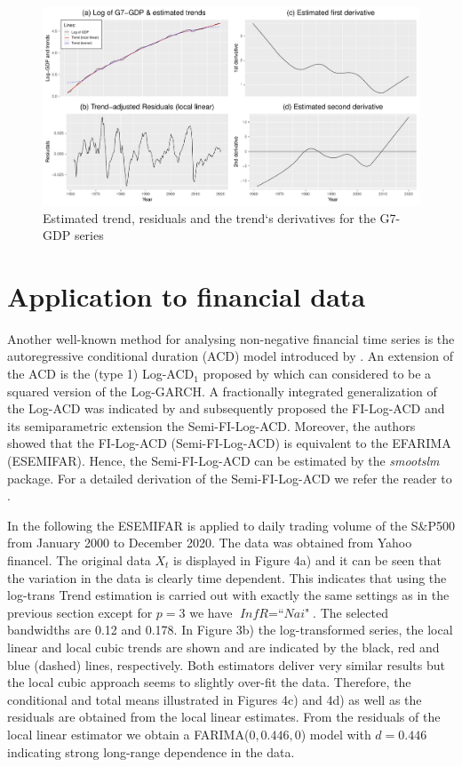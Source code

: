 \documentclass[12pt]{article}
\begin{document}
\begin{figure}[h!]
	\includegraphics[trim = {0cm 0mm 0mm 0mm}, width = \textwidth]{Abb/G7gdp.pdf}
	\caption{Estimated trend, residuals and the trend`s derivatives for the G7-GDP series}
\end{figure}


\section{Application to financial data}
 Another well-known method for analysing non-negative financial time series is the autoregressive conditional duration (ACD) model introduced by \citet{engle1998autoregressive}. An extension of the ACD is the (type 1) Log-ACD$_1$ proposed by \citet{bauwens2008moments} which can considered to be a squared version of the Log-GARCH. A fractionally integrated generalization of the Log-ACD was indicated by \citet{beran2015modelling} and subsequently \citet{feng2015forecasting} proposed the FI-Log-ACD and its semiparametric extension the Semi-FI-Log-ACD. Moreover, the authors showed that the FI-Log-ACD (Semi-FI-Log-ACD) is equivalent to the EFARIMA (ESEMIFAR). Hence, the Semi-FI-Log-ACD can be estimated by the \textit{smootslm} package. For a detailed derivation of the Semi-FI-Log-ACD we refer the reader to \citet{feng2015forecasting}.

 In the following the ESEMIFAR is applied to daily trading volume of the S\&P500 from January 2000 to December 2020. The data was obtained from Yahoo financel. The original data $X_t$ is displayed in Figure 4a) and it can be seen that the variation in the data is clearly time dependent. This indicates that using the log-trans Trend estimation is carried out with exactly the same settings as in the previous section except for $p=3$ we have $\textit{InfR} = \textit{``Nai"}$. The selected bandwidths are 0.12 and 0.178. In Figure 3b) the log-transformed series, the local linear and local cubic trends are shown and are indicated by the black, red and blue (dashed) lines, respectively. Both estimators deliver very similar results but the local cubic approach seems to slightly over-fit the data. Therefore, the conditional and total means illustrated in Figures 4c) and 4d) as well as the residuals are obtained from the local linear estimates. From the residuals of the local linear estimator we obtain a FARIMA($0, 0.446, 0$) model with $\hat{d} = 0.446$ indicating strong long-range dependence in the data. 
 
\end{document}
